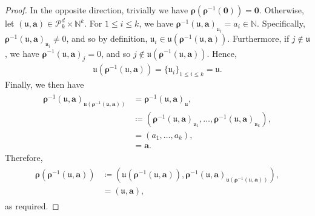 \documentclass[10pt,a4paper]{amsart}
\begin{document}
\begin{proof}
In the opposite direction, trivially we have \(\boldsymbol{\rho}(\boldsymbol{\rho}^{-1}(\mathbf{0}))=\mathbf{0}\). Otherwise, let \((\mathfrak{u},\mathbf{a})\in\mathcal{P}^d_k\times\mathbb{N}^k\). For \(1\leq i\leq k\), we have \(\boldsymbol{\rho}^{-1}(\mathfrak{u},\mathbf{a})_{\mathfrak{u}_i}= a_i\in\mathbb{N}\). Specifically, \(\boldsymbol{\rho}^{-1}(\mathfrak{u},\mathbf{a})_{\mathfrak{u}_i}\neq0\), and so by definition, \(\mathfrak{u}_i\in\mathfrak{u}(\boldsymbol{\rho}^{-1}(\mathfrak{u},\mathbf{a}))\). Furthermore, if \(j\notin\mathfrak{u}\), we have \(\boldsymbol{\rho}^{-1}(\mathfrak{u},\mathbf{a})_j=0\), and so \(j\notin\mathfrak{u}(\boldsymbol{\rho}^{-1}(\mathfrak{u},\mathbf{a}))\). Hence,
\begin{align}
    \mathfrak{u}(\boldsymbol{\rho}^{-1}(\mathfrak{u},\mathbf{a}))=\{\mathfrak{u}_i\}_{1\leq i \leq k}=\mathfrak{u}.\nonumber
\end{align}
Finally, we then have
\begin{align}
    \begin{split}
    \boldsymbol{\rho}^{-1}(\mathfrak{u},\mathbf{a})_{\mathfrak{u}(\boldsymbol{\rho}^{-1}(\mathfrak{u},\mathbf{a}))}&=\boldsymbol{\rho}^{-1}(\mathfrak{u},\mathbf{a})_{\mathfrak{u}},\\
    &\coloneqq\left(\boldsymbol{\rho}^{-1}(\mathfrak{u},\mathbf{a})_{\mathfrak{u}_1},\dots,\boldsymbol{\rho}^{-1}(\mathfrak{u},\mathbf{a})_{\mathfrak{u}_k}\right),\\
    &=(a_{1},\dots,a_{k}), \\
    &= \mathbf{a}.
    \end{split}\nonumber
\end{align}
Therefore,
\begin{align}
    \begin{split}
    \boldsymbol{\rho}(\boldsymbol{\rho}^{-1}(\mathfrak{u},\mathbf{a}))&\coloneqq\left(\mathfrak{u}(\boldsymbol{\rho}^{-1}(\mathfrak{u},\mathbf{a})),\boldsymbol{\rho}^{-1}(\mathfrak{u},\mathbf{a})_{\mathfrak{u}(\boldsymbol{\rho}^{-1}(\mathfrak{u},\mathbf{a}))}\right),\\
    &=(\mathfrak{u},\mathbf{a}),\nonumber
    \end{split}
\end{align}
as required.
\end{proof}
\end{document}
